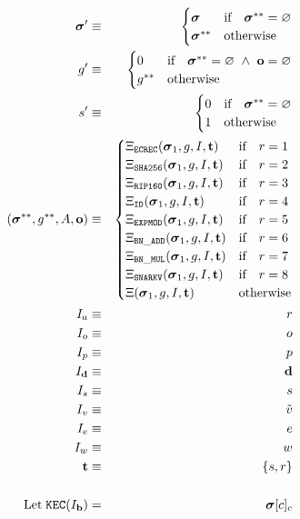 \documentclass[9pt,oneside]{amsart}
\begin{document}
\begin{multicols}{2}
\begin{eqnarray}
\boldsymbol{\sigma}' & \equiv & \begin{cases}
\boldsymbol{\sigma} & \text{if} \quad \boldsymbol{\sigma}^{**} = \varnothing \\
\boldsymbol{\sigma}^{**} & \text{otherwise}
\end{cases} \\
g' & \equiv & \begin{cases}
0 & \text{if} \quad \boldsymbol{\sigma}^{**} = \varnothing \ \wedge \ \mathbf{o} = \varnothing \\
g^{**} & \text{otherwise}
\end{cases} \\ \nonumber
s' & \equiv & \begin{cases}
0 & \text{if} \quad \boldsymbol{\sigma}^{**} = \varnothing \\
1 & \text{otherwise}
\end{cases} \\
\qquad (\boldsymbol{\sigma}^{**}, g^{**}, A, \mathbf{o}) & \equiv & \begin{cases}
\Xi_{\mathtt{ECREC}}(\boldsymbol{\sigma}_1, g, I, \mathbf{t}) & \text{if} \quad r = 1 \\
\Xi_{\mathtt{SHA256}}(\boldsymbol{\sigma}_1, g, I, \mathbf{t}) & \text{if} \quad r = 2 \\
\Xi_{\mathtt{RIP160}}(\boldsymbol{\sigma}_1, g, I, \mathbf{t}) & \text{if} \quad r = 3 \\
\Xi_{\mathtt{ID}}(\boldsymbol{\sigma}_1, g, I, \mathbf{t}) & \text{if} \quad r = 4 \\
\Xi_{\mathtt{EXPMOD}}(\boldsymbol{\sigma}_1, g, I, \mathbf{t}) & \text{if} \quad r = 5 \\
\Xi_{\mathtt{BN\_ADD}}(\boldsymbol{\sigma}_1, g, I, \mathbf{t}) & \text{if} \quad r = 6 \\
\Xi_{\mathtt{BN\_MUL}}(\boldsymbol{\sigma}_1, g, I, \mathbf{t}) & \text{if} \quad r = 7 \\
\Xi_{\mathtt{SNARKV}}(\boldsymbol{\sigma}_1, g, I, \mathbf{t}) & \text{if} \quad r = 8 \\
\Xi(\boldsymbol{\sigma}_1, g, I, \mathbf{t}) & \text{otherwise} \end{cases} \\
I_a & \equiv & r \\
I_o & \equiv & o \\
I_p & \equiv & p \\
I_\mathbf{d} & \equiv & \mathbf{d} \\
I_s & \equiv & s \\
I_v & \equiv & \tilde{v} \\
I_e & \equiv & e \\
I_w & \equiv & w \\
\mathbf{t} & \equiv & \{s, r\} \\
\\ \nonumber
\text{Let} \; \mathtt{\tiny KEC}(I_\mathbf{b}) & = & \boldsymbol{\sigma}[c]_c
\end{eqnarray}


\end{multicols}
\end{document}
